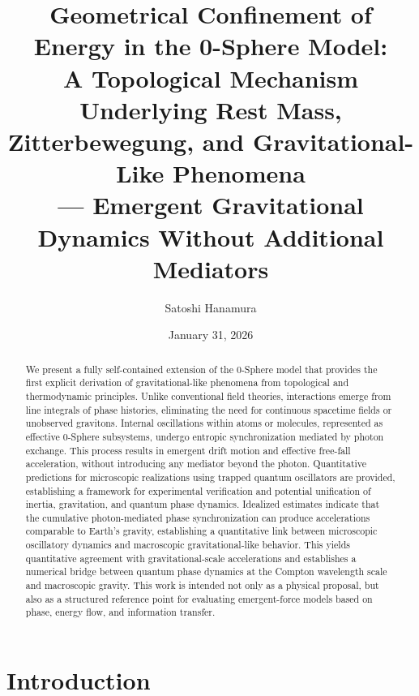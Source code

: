 \documentclass[%
 reprint,
 amsmath,amssymb,
 aps,
 prb,
]{revtex4-2}
\numberwithin{equation}{section}
\begin{document}
\title{Geometrical Confinement of Energy in the 0-Sphere Model:\\
A Topological Mechanism Underlying Rest Mass,\\
Zitterbewegung, and Gravitational-Like Phenomena\\[0.5ex]
\normalsize --- Emergent Gravitational Dynamics Without Additional Mediators}

\author{Satoshi Hanamura}
\date{January 31, 2026}

\begin{abstract}
We present a fully self-contained extension of the 0-Sphere model that provides the first explicit derivation of gravitational-like phenomena from topological and thermodynamic principles. Unlike conventional field theories, interactions emerge from line integrals of phase histories, eliminating the need for continuous spacetime fields or unobserved gravitons. Internal oscillations within atoms or molecules, represented as effective 0-Sphere subsystems, undergo entropic synchronization mediated by photon exchange. This process results in emergent drift motion and effective free-fall acceleration, without introducing any mediator beyond the photon. Quantitative predictions for microscopic realizations using trapped quantum oscillators are provided, establishing a framework for experimental verification and potential unification of inertia, gravitation, and quantum phase dynamics. Idealized estimates indicate that the cumulative photon-mediated phase synchronization can produce accelerations comparable to Earth's gravity, establishing a quantitative link between microscopic oscillatory dynamics and macroscopic gravitational-like behavior. This yields quantitative agreement with gravitational-scale accelerations and establishes a numerical bridge between quantum phase dynamics at the Compton wavelength scale and macroscopic gravity. This work is intended not only as a physical proposal, but also as a structured reference point for evaluating emergent-force models based on phase, energy flow, and information transfer.
\end{abstract}

\maketitle

\section{Introduction}
\label{sec:introduction}
\end{document}
